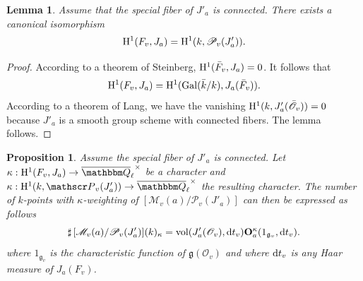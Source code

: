 \documentclass[12pt,english]{smfart}
\numberwithin{equation}{subsection}
\newtheorem{lemme}[equation]{Lemma}
\newtheorem{proposition}[equation]{Proposition}
\theoremstyle{remark}
\newcommand\calP{{\mathscr P}}
\newcommand\calM{{\mathscr M}}
\newcommand\calO{{\mathscr O}}
\newcommand\frakg{{\mathfrak g}}
\newcommand\QQ{{\mathbbm Q}}
\newcommand\rmH{{\rm H}}
\newcommand\Gal{{\rm Gal}}
\newcommand\Ql{{\overline\QQ_\ell}}
\begin{document}
\begin{lemme} Assume that the special fiber of $J'_a$ is connected.
There exists a canonical isomorphism
$$\rmH^1(F_v,J_a)=\rmH^1(k, \calP_v(J'_a)).$$
\end{lemme}

\begin{proof}
According to a theorem of Steinberg, $\rmH^1(\bar F_v, J_a)=0$. It
follows that
$$
\rmH^1(F_v,J_a)=\rmH^1(\Gal(\bar k/ k), J_a(\bar F_v)).
$$
According to a theorem of Lang, we have the vanishing
$\rmH^1(k,J'_a(\bar\calO_v))=0$ because $J'_a$ is a smooth group scheme
with connected fibers. The lemma follows.
\end{proof}



\begin{proposition}\label{comptage avec P_v(J'_a)}
Assume the special fiber of $J'_a$ is connected. Let
$\kappa:\rmH^1(F_v,J_a) \rightarrow \Ql^\times$ be a character and
$\kappa:\rmH^1(k, \calP_v(J'_a)) \rightarrow \Ql^\times$ the resulting character.
The number of $k$-points with $\kappa$-weighting of
$[\calM_v(a)/\calP_v(J'_a)]$ can then be expressed as follows
$${\sharp\,} [\calM_v(a)/\calP_v(J'_a)](k)_\kappa=
{\rm vol}(J'_a(\calO_v),{\rm d}t_v){\bf O}^\kappa_a(1_{\frakg_v},{\rm d}t_v).
$$
where $1_{\frakg_v}$ is the characteristic function of $\frakg(\calO_v)$ and
where ${\rm d}t_v$ is any Haar measure of $J_a(F_v)$.

\end{proposition}
\end{document}
